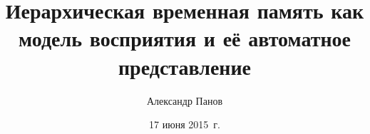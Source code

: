 \documentclass[smaller,professionalfonts]{beamer}
\begin{document}
	
	\title[Perception and HTM]{Иерархическая временная память как модель восприятия и её автоматное представление}
	\author[Панов]{Александр Панов}
	\date{17 июня 2015~г.} 
	
	\begin{frame}
		\titlepage
	\end{frame}
	
\end{document}
